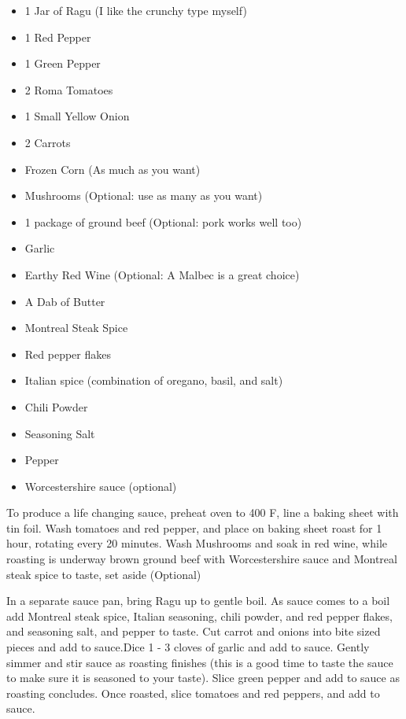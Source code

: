 \documentclass{article}
\begin{document}
\vspace{5mm}
{\selectfont 
    \begin{itemize}[noitemsep]
    
      \item[] 1 Jar of Ragu (I like the crunchy type myself)
      \item[] 1 Red Pepper
      \item[] 1 Green Pepper
      \item[] 2 Roma Tomatoes
      \item[] 1 Small Yellow Onion
      \item[] 2 Carrots
      \item[] Frozen Corn (As much as you want)
      \item[] Mushrooms (Optional: use as many as you want)
      \item[] 1 package of ground beef (Optional: pork works well too)
      \item[] Garlic
      \item[] Earthy Red Wine (Optional: A Malbec is a great choice)
      \item[] A Dab of Butter
      \item[] Montreal Steak Spice
      \item[] Red pepper flakes
      \item[] Italian spice (combination of oregano, basil, and salt)
      \item[] Chili Powder
      \item[] Seasoning Salt
      \item[] Pepper
      \item[] Worcestershire sauce (optional)
      
    \end{itemize}
    }


\newpage    
To produce a life changing sauce, preheat oven to 400 F, line a baking sheet with tin foil. Wash tomatoes and red pepper, and place on baking sheet roast for 1 hour, rotating every 20 minutes. Wash Mushrooms and soak in red wine, while roasting is underway brown ground beef with Worcestershire sauce and Montreal steak spice to taste, set aside (Optional)

In a separate sauce pan, bring Ragu up to gentle boil. As sauce comes to a boil add Montreal steak spice, Italian seasoning, chili powder, and red pepper flakes, and seasoning salt, and pepper to taste. Cut carrot and onions into bite sized pieces and add to sauce.Dice 1 - 3 cloves of garlic and add to sauce. Gently simmer and stir sauce as roasting finishes (this is a good time to taste the sauce to make sure it is seasoned to your taste). Slice green pepper and add to sauce as roasting concludes. Once roasted, slice tomatoes and red peppers, and add to sauce. 
\end{document}
